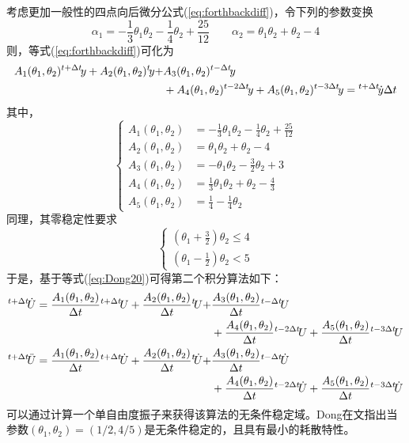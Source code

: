 考虑更加一般性的四点向后微分公式(\ref{eq:forthbackdiff})，令下列的参数变换
\begin{equation}
\alpha_1=-\frac{1}{3}\theta_1\theta_2-\frac{1}{4}\theta_2+\frac{25}{12}\qquad \alpha_2=\theta_1\theta_2+\theta_2-4
\end{equation}
则，等式(\ref{eq:forthbackdiff})可化为
\begin{align}
A_1(\theta_1,\theta_2){^{t+\Delta t}\!y}+A_2(\theta_1,\theta_2){^{t}\!y}+&A_3(\theta_1,\theta_2){^{t-\Delta t}\!y}\notag\\
&+A_4(\theta_1,\theta_2){^{t-2\Delta t}\!y}+A_5(\theta_1,\theta_2){^{t-3\Delta t}\!y}={^{t+\Delta t}\!\dot{y}\Delta t}\label{eq:Dong20}
\end{align}
其中，
\begin{equation}
\left\{\begin{aligned}
A_1(\theta_1,\theta_2)&=-\frac{1}{3}\theta_1\theta_2-\frac{1}{4}\theta_2+\frac{25}{12}\\
A_2(\theta_1,\theta_2)&=\theta_1\theta_2+\theta_2-4\\
A_3(\theta_1,\theta_2)&=-\theta_1\theta_2-\frac{3}{2}\theta_2+3\\
A_4(\theta_1,\theta_2)&=\frac{1}{3}\theta_1\theta_2+\theta_2-\frac{4}{3}\\
A_5(\theta_1,\theta_2)&=\frac{1}{4}-\frac{1}{4}\theta_2
\end{aligned}\right.
\end{equation}
同理，其零稳定性要求
\begin{equation}
\begin{cases}
(\theta_1+\frac{3}{2})\theta_2\le4\\
(\theta_1-\frac{1}{2})\theta_2<5
\end{cases}
\end{equation}
于是，基于等式(\ref{eq:Dong20})可得第二个积分算法如下：
\begin{align}
{^{t+\Delta t}\!\dot{U}}=\frac{A_1(\theta_1,\theta_2)}{\Delta t}{^{t+\Delta t}\!U}+\frac{A_2(\theta_1,\theta_2)}{\Delta t}{^{t}\!U}+&\frac{A_3(\theta_1,\theta_2)}{\Delta t}{^{t-\Delta t}\!U}\notag\\
&+\frac{A_4(\theta_1,\theta_2)}{\Delta t}{^{t-2\Delta t}\!U}+\frac{A_5(\theta_1,\theta_2)}{\Delta t}{^{t-3\Delta t}\!U}\\
{^{t+\Delta t}\!\ddot{U}}=\frac{A_1(\theta_1,\theta_2)}{\Delta t}{^{t+\Delta t}\!\dot{U}}+\frac{A_2(\theta_1,\theta_2)}{\Delta t}{^{t}\!\dot{U}}+&\frac{A_3(\theta_1,\theta_2)}{\Delta t}{^{t-\Delta t}\!\dot{U}}\notag\\
&+\frac{A_4(\theta_1,\theta_2)}{\Delta t}{^{t-2\Delta t}\!\dot{U}}+\frac{A_5(\theta_1,\theta_2)}{\Delta t}{^{t-3\Delta t}\!\dot{U}}
\end{align}
可以通过计算一个单自由度振子来获得该算法的无条件稳定域。Dong在文指出当参数$(\theta_1,\theta_2)=(1/2,4/5)$是无条件稳定的，且具有最小的耗散特性。

